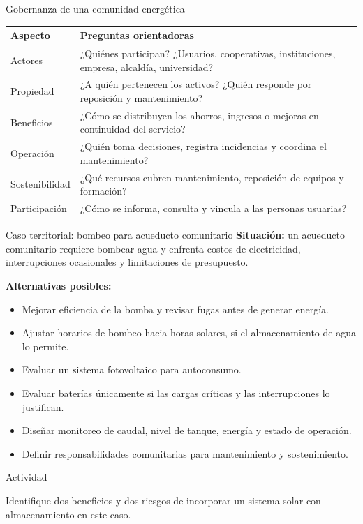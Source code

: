 \documentclass[aspectratio=169,10pt]{beamer}
\newcommand{\actividad}[1]{
\begin{alertblock}{Actividad}
#1
\end{alertblock}
}
\begin{document}
\begin{frame}{Gobernanza de una comunidad energética}
\begin{table}
\centering
\small
\begin{tabular}{p{} p{}}
\toprule
\textbf{Aspecto} & \textbf{Preguntas orientadoras} \\
\midrule
Actores & ¿Quiénes participan? ¿Usuarios, cooperativas, instituciones, empresa, alcaldía, universidad? \\
\addlinespace
Propiedad & ¿A quién pertenecen los activos? ¿Quién responde por reposición y mantenimiento? \\
\addlinespace
Beneficios & ¿Cómo se distribuyen los ahorros, ingresos o mejoras en continuidad del servicio? \\
\addlinespace
Operación & ¿Quién toma decisiones, registra incidencias y coordina el mantenimiento? \\
\addlinespace
Sostenibilidad & ¿Qué recursos cubren mantenimiento, reposición de equipos y formación? \\
\addlinespace
Participación & ¿Cómo se informa, consulta y vincula a las personas usuarias? \\
\bottomrule
\end{tabular}
\end{table}
\end{frame}

\begin{frame}{Caso territorial: bombeo para acueducto comunitario}
\textbf{Situación:} un acueducto comunitario requiere bombear agua y enfrenta costos de electricidad, interrupciones ocasionales y limitaciones de presupuesto.

\vspace{0.3cm}

\textbf{Alternativas posibles:}
\begin{itemize}
    \item Mejorar eficiencia de la bomba y revisar fugas antes de generar energía.
    \item Ajustar horarios de bombeo hacia horas solares, si el almacenamiento de agua lo permite.
    \item Evaluar un sistema fotovoltaico para autoconsumo.
    \item Evaluar baterías únicamente si las cargas críticas y las interrupciones lo justifican.
    \item Diseñar monitoreo de caudal, nivel de tanque, energía y estado de operación.
    \item Definir responsabilidades comunitarias para mantenimiento y sostenimiento.
\end{itemize}

\actividad{
Identifique dos beneficios y dos riesgos de incorporar un sistema solar con almacenamiento en este caso.
}
\end{frame}
\end{document}

